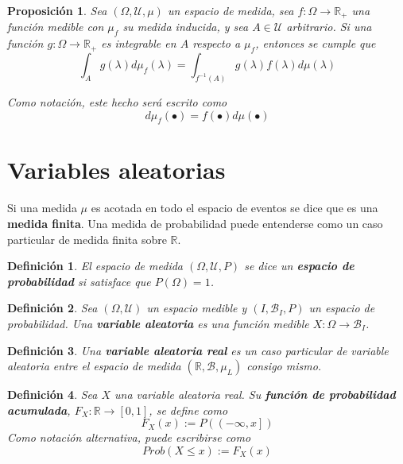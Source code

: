 \documentclass[12pt,letterpaper]{book}
\newtheorem{definicion}{Definición}[chapter]
\newtheorem{proposicion}[teorema]{Proposición}
\newcommand{\R}{\mathbb{R}}
\begin{document}
\begin{proposicion}
Sea $(\Omega, \mathcal{U}, \mu)$ un espacio de medida, sea $f:\Omega \rightarrow \R_+$ una función medible con $\mu_f$ su medida inducida, y sea $A\in \mathcal{U}$ arbitrario.
%
Si una función $g:\Omega \rightarrow \R_+$ es integrable en $A$ respecto a $\mu_f$, entonces se cumple que 
\begin{equation}
\int_A g(\lambda) d\mu_f(\lambda) = \int_{f^{-1}(A)} g(\lambda) f(\lambda) d\mu(\lambda)
\end{equation}

Como notación, este hecho será escrito como
\begin{equation}
d\mu_f(\bullet) = f(\bullet) d\mu(\bullet) 
\end{equation}
\label{lazy3}
\end{proposicion}


\section{Variables aleatorias}

Si una medida $\mu$ es acotada en todo el espacio de eventos se dice que es una \textbf{medida finita}.
%
Una medida de probabilidad puede entenderse como un caso particular de medida finita sobre $\R$.

\begin{definicion}
El espacio de medida $(\Omega,\mathcal{U},P)$ se dice un \textbf{espacio de probabilidad} si satisface que $P(\Omega) = 1$.
\end{definicion}

\begin{definicion}
Sea $(\Omega,\mathcal{U})$ un espacio medible y $(I,\mathcal{B}_I,P)$ un espacio de probabilidad. Una \textbf{variable aleatoria} es una función medible $X: \Omega \rightarrow \mathcal{B}_I$.
\label{lazy4}
\end{definicion}

\begin{definicion}
Una \textbf{variable aleatoria real} es un caso particular de variable aleatoria entre el espacio de medida $(\R,\mathcal{B},\mu_L)$ consigo mismo.
\end{definicion}

\begin{definicion}%
Sea $X$ una variable aleatoria real. Su \textbf{función de probabilidad acumulada}, $F_X : \R \rightarrow [0,1]$, se define como
\begin{equation*}
F_X (x) := P\left( \left(-\infty,x \right] \right)
\end{equation*}
Como notación alternativa, puede escribirse como
\begin{equation}
Prob(X\leq x) := F_X(x) 
\end{equation}
\end{definicion}
\end{document}
